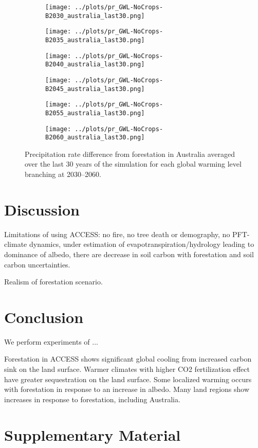 \documentclass[]{article}
\begin{document}
\begin{figure}[H]
    \centering
    \begin{subfigure}[b]{0.4\linewidth}
        \texttt{[image: ../plots/pr\_GWL-NoCrops-B2030\_australia\_last30.png]}
    \end{subfigure}
    \begin{subfigure}[b]{0.4\linewidth}
        \texttt{[image: ../plots/pr\_GWL-NoCrops-B2035\_australia\_last30.png]}
    \end{subfigure}
    \begin{subfigure}[b]{0.4\linewidth}
        \texttt{[image: ../plots/pr\_GWL-NoCrops-B2040\_australia\_last30.png]}
    \end{subfigure}
    \begin{subfigure}[b]{0.4\linewidth}
        \texttt{[image: ../plots/pr\_GWL-NoCrops-B2045\_australia\_last30.png]}
    \end{subfigure}
    \begin{subfigure}[b]{0.4\linewidth}
        \texttt{[image: ../plots/pr\_GWL-NoCrops-B2055\_australia\_last30.png]}
    \end{subfigure}
    \begin{subfigure}[b]{0.4\linewidth}
        \texttt{[image: ../plots/pr\_GWL-NoCrops-B2060\_australia\_last30.png]}
    \end{subfigure}
    \caption{Precipitation rate difference from forestation in Australia averaged over the last 30 years of the simulation for each global warming level branching at 2030–2060.}
    \label{fig:pr_australia}
\end{figure}

\section{Discussion}

Limitations of using ACCESS: no fire, no tree death or demography, no PFT-climate dynamics, under estimation of evapotranspiration/hydrology leading to dominance of albedo, there are decrease in soil carbon with forestation and soil carbon uncertainties.

Realism of forestation scenario.

\section{Conclusion}

We perform experiments of ...

Forestation in ACCESS shows significant global cooling from increased carbon sink on the land surface.
Warmer climates with higher CO2 fertilization effect have greater sequestration on the land surface.
Some localized warming occurs with forestation in response to an increase in albedo. 
Many land regions show increases in response to forestation, including Australia.

\printbibliography

\section{Supplementary Material}
\setcounter{figure}{0}
\end{document}
